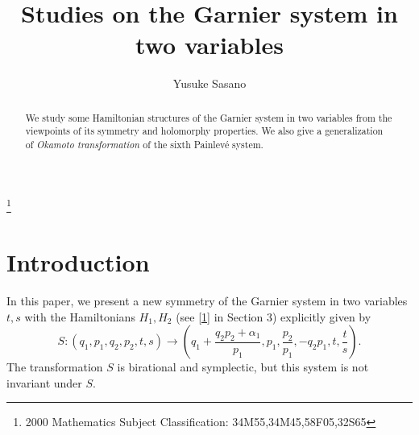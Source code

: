 \newtheorem{thm}{Theorem}[section]
\newtheorem{prop}[thm]{Proposition}
\newtheorem{Lemma}[thm]{Lemma}
\newtheorem{cor}[thm]{Corollary}
\newtheorem{conj}[thm]{Conjecture}
\theoremstyle{definition}
\newtheorem{Problem}{Problem}[section]
\newtheorem{rem}[thm]{Remark}
\newcommand{\BZ}{{\mathbb Z}}
\newcommand{\dsfrac}[2]{{\displaystyle\frac{#1}{#2}}}
\def\qed{~\rule{1mm}{2.5mm}}


\title{Studies on the Garnier system in two variables \\}

\author{ Yusuke Sasano }
\thanks{2000 Mathematics Subject Classification: 34M55,34M45,58F05,32S65}
\maketitle


\begin{abstract}
We study some Hamiltonian structures of the Garnier system in two variables from the viewpoints of its symmetry and holomorphy properties. We also give a generalization of {\it Okamoto transformation \it}of the sixth Painlev\'e system.
\end{abstract}

\section{Introduction}
In this paper, we present a new symmetry of the Garnier system in two variables $t,s$ with the Hamiltonians $H_1,H_2$ (see \eqref{1} in Section 3) explicitly given by
\begin{equation}\label{extensionoka}
S:(q_1,p_1,q_2,p_2,t,s) \rightarrow \left(q_1+\frac{q_2p_2+\alpha_1}{p_1},p_1,\frac{p_2}{p_1},-q_2p_1,t,\frac{t}{s}\right).
\end{equation}
The transformation $S$ is birational and symplectic, but this system is not invariant under $S$.

